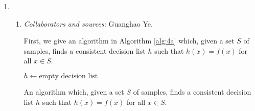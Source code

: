 \documentclass[letterpaper, reqno,11pt]{article}
\newcommand{\PP}{\mathop{{}\mathbb{P}}}
\DeclareMathOperator{\error}{error}
\begin{document}
\begin{enumerate}
\begin{proof}
\begin{align*}
      &\geq \PP\left[\left(\left|\error_{\mathcal D}\left(h_i\right) - \error_S\left(h_i\right)\right| < \frac{\varepsilon}{4} \;\forall i \in [\ell]\right) \wedge \left(\exists i \in [\ell], \error_{\mathcal D}\left(h_i\right) \leq \frac{\varepsilon}{2}\right)\right] \\
      &\geq 1 - \left(\frac{\delta}{3} + \frac{\delta}{3}\right) \\
      &= 1 - \frac{2\delta}{3}.
    \end{align*}
    By the union bound again,
    \begin{align*}
      \PP\left[\error_{\mathcal D}\left(h_{i^*}\right) < \varepsilon\right] &\geq \PP\left[\left(\left|\error_{\mathcal D}\left(h_i\right) - \error_S\left(h_i\right)\right| < \frac{\varepsilon}{4} \;\forall i \in [\ell]\right) \wedge \left(\error_S\left(h_{i^*}\right) < \frac{3\varepsilon}{4}\right)\right] \\
      &\geq 1 - \left(\frac{\delta}{3} + \frac{2\delta}{3}\right) \\
      &= 1 - \delta.
    \end{align*}
    This completes the proof.
  \end{proof}

  \clearpage

  \item \begin{enumerate}
    \item \noindent\emph{Collaborators and sources:} Guanghao Ye.
    
    \bigskip

    First, we give an algorithm in Algorithm \ref{alg:4a} which, given a set $S$ of samples, finds a consistent decision list $h$ such that $h(x) = f(x)$ for all $x \in S$.

    \begin{algorithm}
      $h \leftarrow \text{empty decision list}$ \\
      \caption{An algorithm which, given a set $S$ of samples, finds a consistent decision list $h$ such that $h(x) = f(x)$ for all $x \in S$.}
      \label{alg:4a}
    \end{algorithm}


\end{enumerate}
\end{enumerate}
\end{document}

